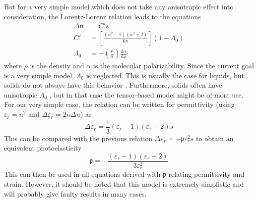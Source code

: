 \documentclass[10pt,a4paper,draft]{scrartcl}
\begin{document}
	But for a very simple model which does not take any anisotropic effect into consideration, the Lorentz-Lorenz relation leads to the equations \cite{Korpel1988}
	\begin{align*}
	\Delta n &= C' s \\
	C' &= \left[ \frac{(n^2-1)(n^2+2)}{6n} \right](1-\Lambda_0) \\
	\Lambda_0 &= -\left( \frac{\rho}{\alpha} \right) \frac{\mathrm{d} \alpha}{\mathrm{d} \rho}
	\end{align*}
	where $\rho$ is the density and $\alpha$ is the molecular polarizability. Since the current goal is a very simple model, $\Lambda_0$ is neglected. This is usually the case for liquids, but solids do not always have this behavior \cite{Korpel1988}. Furthermore, solids often have anisotropic $\Lambda_0$ \cite{Korpel1988}, but in that case the tensor-based model might be of more use. For our very simple case, the relation can be written for permittivity (using $\varepsilon_r = n^2$ and $\Delta \varepsilon_r = 2n \Delta n$) as
	\begin{equation*}
	\Delta \varepsilon_r = \frac{1}{3} (\varepsilon_r - 1)(\varepsilon_r + 2) s
	\end{equation*}
	This can be compared with the previous relation $\Delta \varepsilon_r = -\mathfrak{p}\varepsilon_r^2 s$ to obtain an equivalent photoelasticity
	\begin{equation*}
	\mathfrak{p} = -\frac{(\varepsilon_r - 1)(\varepsilon_r + 2)}{3\varepsilon_r^2}
	\end{equation*}
	This can then be used in all equations derived with $\mathfrak{p}$ relating permittivity and strain. However, it should be noted that this model is extremely simplistic and will probably give faulty results in many cases.
	
	
\end{document}
